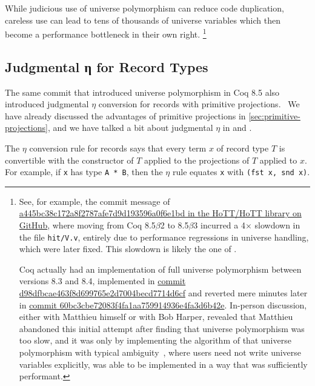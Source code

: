 While judicious use of universe polymorphism can reduce code duplication, careless use can lead to tens of thousands of universe variables which then become a performance bottleneck in their own right.%
\footnote{%
  See, for example, the commit message of \href{https://github.com/HoTT/HoTT/commit/a445bc38c172a8f2787afe7d9d193596a0f6e1bd}{a445bc38c172a8f2787afe7d9d193596a0f6e1bd in the HoTT/HoTT library on GitHub}, where moving from Coq 8.5$\beta$2 to 8.5$\beta$3 incurred a 4$\times$ slowdown in the file \texttt{hit/V.v}, entirely due to performance regressions in universe handling, which were later fixed.
  This slowdown is likely the one of .

  Coq actually had an implementation of full universe polymorphism between versions 8.3 and 8.4, implemented in \href{https://github.com/coq/coq/commit/d98dfbcae463f8d699765e2d7004becd7714d6cf}{commit d98dfbcae463f8d699765e2d7004becd7714d6cf} and reverted mere minutes later in \href{https://github.com/coq/coq/commit/60bc3cbe72083f4fa1aa759914936e4fa3d6b42e}{commit 60bc3cbe72083f4fa1aa759914936e4fa3d6b42e}.
  In-person discussion, either with Matthieu himself or with Bob Harper, revealed that Matthieu abandoned this initial attempt after finding that universe polymorphism was too slow, and it was only by implementing the algorithm of \citet{Harper1991107} that universe polymorphism with typical ambiguity~\cite{Universe2012Shulman,Typical1966Specker,Harper1991107}, where users need not write universe variables explicitly, was able to be implemented in a way that was sufficiently performant.%
}

\subsection{Judgmental η for Record Types}\label{sec:fixes:theory:record-eta}\label{sec:record-eta}
The same commit that introduced universe polymorphism in Coq 8.5 also introduced judgmental $\eta$ conversion for records with primitive projections.~\cite{coq-commit-polyproj}
We have already discussed the advantages of primitive projections in \autoref{sec:primitive-projections}, and we have talked a bit about judgmental $\eta$ in  and .

The $\eta$ conversion rule for records says that every term $x$ of record type $T$ is convertible with the constructor of $T$ applied to the projections of $T$ applied to $x$.
For example, if \texttt{x} has type \texttt{A * B}, then the $\eta$ rule equates \texttt{x} with \texttt{(fst x, snd x)}.

